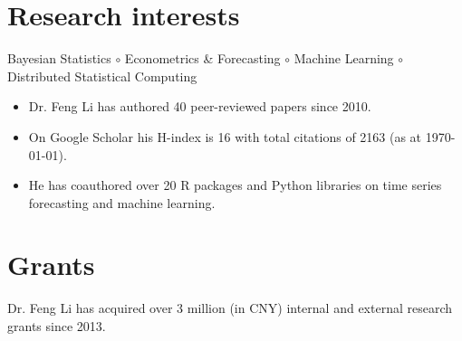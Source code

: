 \documentclass[twoside,a4paper]{article}
\begin{document}
\section{Research interests}

Bayesian Statistics $\circ$ Econometrics \& Forecasting $\circ$ Machine Learning $\circ$ Distributed Statistical Computing

\begin{itemize}
\item Dr. Feng Li has authored 40 peer-reviewed papers since 2010.
\item On Google Scholar his H-index is 16 with total citations of 2163 (as at \today).
\item He has coauthored over 20 R packages and Python libraries on time series forecasting and machine learning.
\end{itemize}

\section{Grants}

Dr. Feng Li has acquired over 3 million (in CNY) internal and external research grants since 2013.
\end{document}
